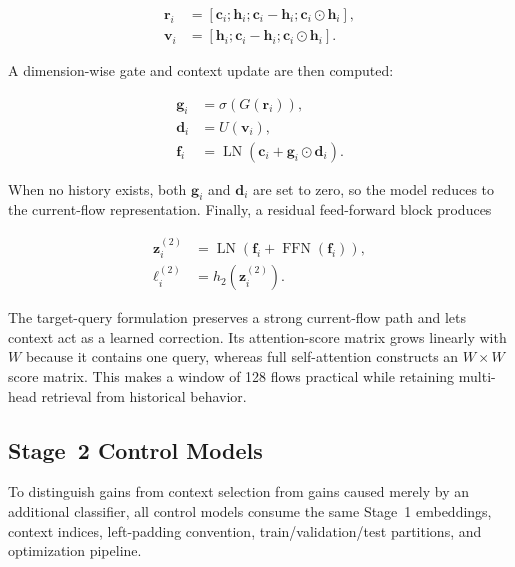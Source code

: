\documentclass[11pt,fleqn]{report}
\begin{document}
\begin{align}
    \mathbf{r}_i
    &=[\mathbf{c}_i;\mathbf{h}_i;
       \mathbf{c}_i-\mathbf{h}_i;
       \mathbf{c}_i\odot\mathbf{h}_i],\\
    \mathbf{v}_i
    &=[\mathbf{h}_i;
       \mathbf{c}_i-\mathbf{h}_i;
       \mathbf{c}_i\odot\mathbf{h}_i].
    \label{eq:target_context_interactions}
\end{align}

A dimension-wise gate and context update are then computed:

\begin{align}
    \mathbf{g}_i&=\sigma(G(\mathbf{r}_i)),\\
    \mathbf{d}_i&=U(\mathbf{v}_i),\\
    \mathbf{f}_i&=\operatorname{LN}
      \left(\mathbf{c}_i+\mathbf{g}_i\odot\mathbf{d}_i\right).
    \label{eq:gated_context_update}
\end{align}

When no history exists, both $\mathbf{g}_i$ and $\mathbf{d}_i$ are set to zero,
so the model reduces to the current-flow representation. Finally, a residual
feed-forward block produces

\begin{align}
    \mathbf{z}^{(2)}_i
    &=\operatorname{LN}
      \left(
        \mathbf{f}_i+\operatorname{FFN}(\mathbf{f}_i)
      \right),\\
    \boldsymbol{\ell}^{(2)}_i
    &=h_2(\mathbf{z}^{(2)}_i).
    \label{eq:stage2_output}
\end{align}

The target-query formulation preserves a strong current-flow path and lets
context act as a learned correction. Its attention-score matrix grows linearly
with $W$ because it contains one query, whereas full self-attention constructs
an $W\times W$ score matrix. This makes a window of 128 flows practical while
retaining multi-head retrieval from historical behavior.

\subsection{Stage~2 Control Models}
\label{subsubsec:stage2_controls}

To distinguish gains from context selection from gains caused merely by an
additional classifier, all control models consume the same Stage~1 embeddings,
context indices, left-padding convention, train/validation/test partitions,
and optimization pipeline.
\end{document}
